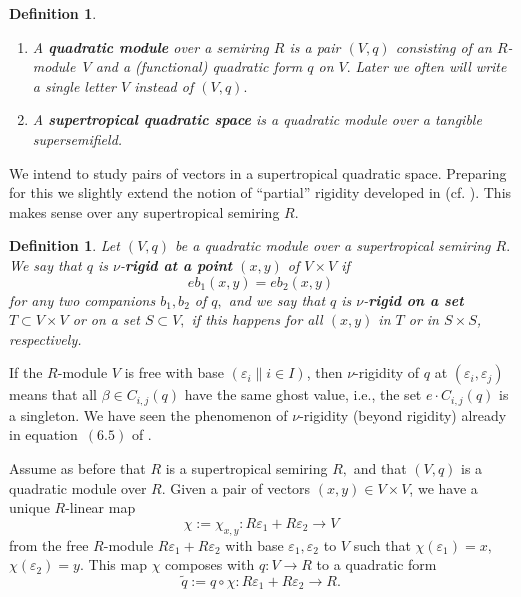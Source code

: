 \documentclass [12pt,a4paper,reqno]{amsart}
\newtheorem{defn}[thm]{Definition}
\begin{document}
\begin{defn}\label{defn:II.5.1}
\quad{}
\begin{enumerate}
  \item[ a)] A {\textbf{{quadratic module}}} over a semiring $R$ is a pair
 $(V,q)$ consisting of an $R$-module~$V$ and a (functional)
 quadratic form $q$ on $V.$ Later we often will  write  a
 single letter $V$ instead of $(V,q).$ {\vskip 1.5mm \noindent}

\item[ b)] A {\textbf{{supertropical quadratic space}}} is a quadratic module
 over a tangible supersemifield.
 \end{enumerate}

 \end{defn}

We intend to study pairs of vectors in a supertropical quadratic
space. Preparing for this we slightly extend the notion of ``partial'' rigidity
developed in {\cite[~\S{{3}}]{QF1}} (cf. {\cite[Definition~{{3.1}}]{QF1}}). This makes
sense over any supertropical semiring $R.$

\begin{defn}\label{defn:II.5.2}
Let $(V,q)$ be a quadratic module over a supertropical semiring
$R.$ We say that $q$ is $\nu$-{\textbf{{rigid at a point}}} $(x,y)$ of
$V\times V$ if
\begin{equation}\label{eq:II.5.1}
eb_1(x,y)=eb_2(x,y)\end{equation} for any two companions $b_1,b_2$
of $q,$ and we say that $q$ is $\nu$-{\textbf{{rigid on a set}}}
$T\subset V\times V$ or on a set $S\subset V,$ if this happens for
all $(x,y)$ in $T$ or in $S\times S$, respectively.
\end{defn}

If the $R$-module $V$ is free with base $({\varepsilon}_i \|i\in I)$,
then $\nu$-rigidity of $q$ at $({\varepsilon}_i,{\varepsilon}_j)$
means that all ${\beta}\in C_{i,j}(q)$ have the same ghost value,
i.e., the set $e\cdot C_{i,j}(q)$ is a singleton. We have seen the
phenomenon of $\nu$-rigidity (beyond rigidity) already in   equation~$(6.5)$ of
{\cite[Theorem~{{6.9}}]{QF1}}.
{\vskip 1.5mm \noindent}

Assume as before that $R$ is a supertropical semiring $R,$ and
that $(V,q)$ is a quadratic module over $R.$ Given a pair of
vectors $(x,y)\in V\times V$, we have a unique  $R$-linear map
\begin{equation}\label{eq:II.5.2}
\chi:=\chi_{x,y}:R{\varepsilon}_1+R{\varepsilon}_2\to V\end{equation}
from the free $R$-module $R{\varepsilon}_1+R{\varepsilon}_2$ with base
${\varepsilon}_1,{\varepsilon}_2$ to $V$ such that
$\chi({\varepsilon}_1)=x,$ $\chi({\varepsilon}_2)=y.$ This map $\chi$
composes with $q:V\to R$ to a quadratic form
\begin{equation}\label{eq:II.5.3} {\tilde q} :=q\circ\chi:R{\varepsilon}_1+R{\varepsilon}_2\to R.\end{equation}
\end{document}
